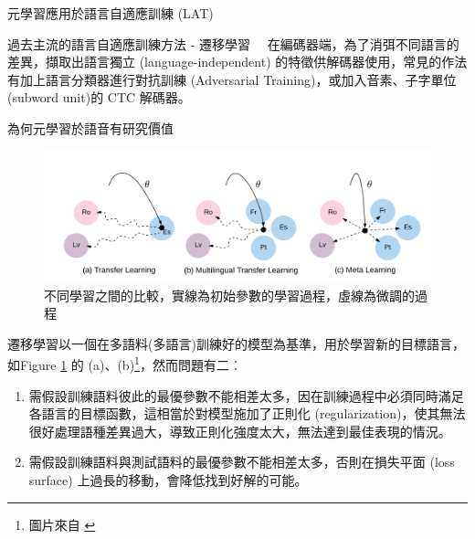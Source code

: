 \documentclass[12pt,UTF8,fntef]{article}
\begin{document}
\begin{section}{元學習應用於語言自適應訓練 (LAT)}
\begin{subsection}{過去主流的語言自適應訓練方法 - 遷移學習}
  ~~在編碼器端，為了消弭不同語言的差異，擷取出語言獨立 (language-independent) 的特徵供解碼器使用，常見的作法有加上語言分類器進行對抗訓練 (Adversarial Training)，或加入音素、子字單位 (subword unit)的 CTC 解碼器。
    \end{subsection}


    \begin{subsection}{為何元學習於語音有研究價值}

  \begin{figure}[ht]
      \centering
      \includegraphics[width=0.8\linewidth]{Meta-motivation.png}
      \caption{不同學習之間的比較，實線為初始參數的學習過程，虛線為微調的過程}
      \label{fig:motivation}
  \end{figure}

  遷移學習以一個在多語料(多語言)訓練好的模型為基準，用於學習新的目標語言，如Figure \ref{fig:motivation} 的 (a)、(b)\footnote{圖片來自 \cite{gu2018meta}}，然而問題有二︰
      \begin{enumerate}[itemsep=-1mm]
        \item 需假設訓練語料彼此的最優參數不能相差太多，因在訓練過程中必須同時滿足各語言的目標函數，這相當於對模型施加了正則化 (regularization)，使其無法很好處理語種差異過大，導致正則化強度太大，無法達到最佳表現的情況。
        \item 需假設訓練語料與測試語料的最優參數不能相差太多，否則在損失平面 (loss surface) 上過長的移動，會降低找到好解的可能。 
      \end{enumerate}


\end{subsection}
\end{section}
\end{document}
